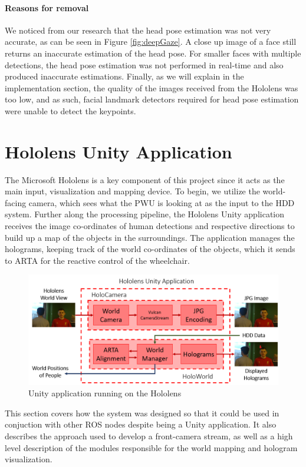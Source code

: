 \paragraph{Reasons for removal} We noticed from our research that the head pose estimation was not very accurate, as can be seen in Figure \ref{fig:deepGaze}. A close up image of a face still returns an inaccurate estimation of the head pose. For smaller faces with multiple detections, the head pose estimation was not performed in real-time and also produced inaccurate estimations. Finally, as we will explain in the implementation section, the quality of the images received from the Hololens was too low, and as such, facial landmark detectors required for head pose estimation were unable to detect the keypoints.

\section{Hololens Unity Application}
The Microsoft Hololens is a key component of this project since it acts as the main input, visualization and mapping device. To begin, we utilize the world-facing camera, which sees what the PWU is looking at as the input to the HDD system. Further along the processing pipeline, the Hololens Unity application receives the image co-ordinates of human detections and respective directions to build up a map of the objects in the surroundings. The application manages the holograms, keeping track of the world co-ordinates of the objects, which it sends to ARTA for the reactive control of the wheelchair.

\begin{figure}[ht]
	\centering
	\includegraphics[width=1.0\linewidth]{img/chapter4_analysis/hololensSystemDiagram.png}
	\caption{Unity application running on the Hololens}
	\label{fig:detailedHololens}
\end{figure}

This section covers how the system was designed so that it could be used in conjuction with other ROS nodes despite being a Unity application. It also describes the approach used to develop a front-camera stream, as well as a high level description of the modules responsible for the world mapping and hologram visualization.

